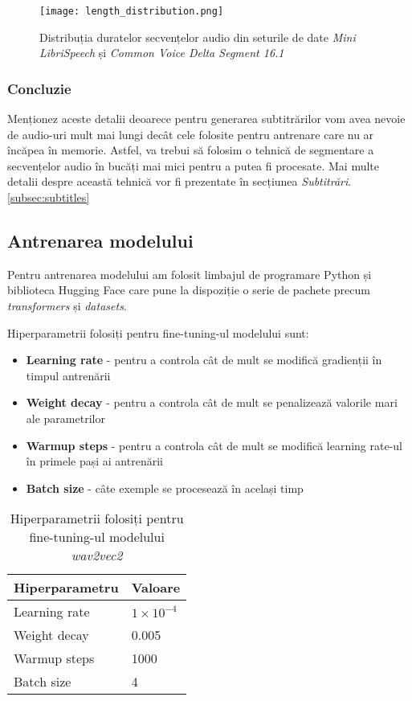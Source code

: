 \begin{figure}[h]
    \centering
    \texttt{[image: length\_distribution.png]}
    \caption{Distribuția duratelor secvențelor audio din seturile de date \textit{Mini LibriSpeech} și \textit{Common Voice Delta Segment 16.1}}
    \label{fig:length-distribution}
\end{figure}

\subsubsection{Concluzie}
Menționez aceste detalii deoarece pentru generarea subtitrărilor vom avea nevoie de audio-uri
mult mai lungi decât cele folosite pentru antrenare care nu ar încăpea în memorie. Astfel, va trebui
să folosim o tehnică de segmentare a secvențelor audio în bucăți mai mici pentru a putea fi procesate.
Mai multe detalii despre această tehnică vor fi prezentate în secțiunea \textit{Subtitrări}. \ref{subsec:subtitles}

\subsection{Antrenarea modelului}
Pentru antrenarea modelului am folosit limbajul de programare Python și biblioteca Hugging Face
care pune la dispoziție o serie de pachete precum \textit{transformers} și \textit{datasets}.
\par
Hiperparametrii folosiți pentru fine-tuning-ul modelului sunt:
\begin{itemize}
    \item \textbf{Learning rate} - pentru a controla cât de mult se modifică gradienții în timpul
    antrenării 
    \item \textbf{Weight decay} - pentru a controla cât de mult se penalizează valorile mari ale
    parametrilor 
    \item \textbf{Warmup steps} - pentru a controla cât de mult se modifică learning rate-ul în
    primele pași ai antrenării
    \item \textbf{Batch size} - câte exemple se procesează în același timp
\end{itemize}

\vspace{0.5em}

\begin{table}[h]
    \centering
    \label{tab:wav2vec2-hyperparameters}
    \begin{tabular}{ll}
    \hline
    \textbf{Hiperparametru} & \textbf{Valoare} \\ \hline
    Learning rate & $1 \times 10^{-4}$ \\
    Weight decay & 0.005 \\
    Warmup steps & 1000 \\
    Batch size & 4 \\ \hline
    \end{tabular}
    \caption{Hiperparametrii folosiți pentru fine-tuning-ul modelului \textit{wav2vec2}}
\end{table}

